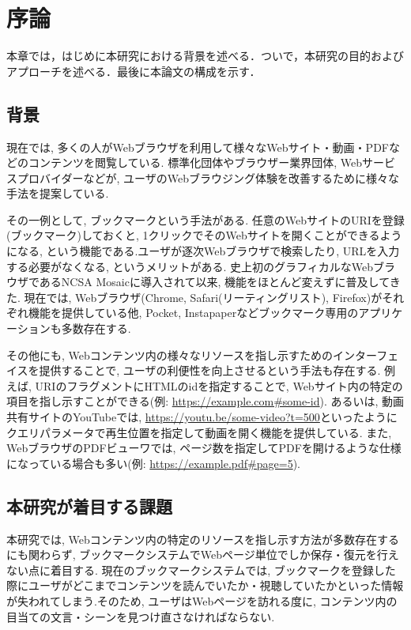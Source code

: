 \chapter{序論}
\label{chap:introduction}

本章では，はじめに本研究における背景を述べる．ついで，本研究の目的およびアプローチを述べる．最後に本論文の構成を示す．

\section{背景}
\label{section:background}

現在では, 多くの人がWebブラウザを利用して様々なWebサイト・動画・PDFなどのコンテンツを閲覧している.
標準化団体やブラウザー業界団体, Webサービスプロバイダーなどが, ユーザのWebブラウジング体験を改善するために様々な手法を提案している.

その一例として, ブックマークという手法がある.
任意のWebサイトのURIを登録(ブックマーク)しておくと, 1クリックでそのWebサイトを開くことができるようになる, という機能である.ユーザが逐次Webブラウザで検索したり, URLを入力する必要がなくなる, というメリットがある.
史上初のグラフィカルなWebブラウザであるNCSA Mosaic\cite{ncsa-mosaic}に導入されて以来, 機能をほとんど変えずに普及してきた.
現在では, Webブラウザ(Chrome\cite{chrome}, Safari\cite{safari}(リーティングリスト), Firefox\cite{firefox})がそれぞれ機能を提供している他, Pocket\cite{pocket}, Instapaper\cite{instapaper}などブックマーク専用のアプリケーションも多数存在する.

その他にも, Webコンテンツ内の様々なリソースを指し示すためのインターフェイスを提供することで, ユーザの利便性を向上させるという手法も存在する.
例えば, URIのフラグメントにHTMLのidを指定することで, Webサイト内の特定の項目を指し示すことができる(例: \url{https://example.com#some-id}).
あるいは, 動画共有サイトのYouTube\cite{youtube}では, \url{https://youtu.be/some-video?t=500}といったようにクエリパラメータで再生位置を指定して動画を開く機能を提供している.
また, WebブラウザのPDFビューワでは, ページ数を指定してPDFを開けるような仕様になっている場合も多い\cite{browser-pdf-viewer-pdf-page-num-function}(例: \url{https://example.pdf#page=5}).

\section{本研究が着目する課題}
本研究では, Webコンテンツ内の特定のリソースを指し示す方法が多数存在するにも関わらず, ブックマークシステムでWebページ単位でしか保存・復元を行えない点に着目する.
現在のブックマークシステムでは, ブックマークを登録した際にユーザがどこまでコンテンツを読んでいたか・視聴していたかといった情報が失われてしまう.そのため, ユーザはWebページを訪れる度に, コンテンツ内の目当ての文言・シーンを見つけ直さなければならない.

